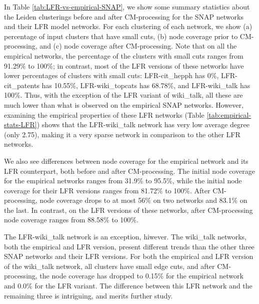 \documentclass[11pt]{article}   	%
\begin{document}
In Table \ref{tab:LFR-vs-empirical-SNAP}, we show some summary statistics about the  Leiden clusterings before and after CM-processing for the SNAP networks and their LFR model networks.  For each clustering of each network, we  show (a) percentage of input clusters that have small cuts, (b) node coverage prior to CM-processing, and (c) node coverage after CM-processing.
Note that on all the empirical networks, the percentage of the clusters with small cuts ranges from 91.29\% to 100\%; in contrast, most of the LFR versions of these
networks have lower percentages of clusters with small cuts:
LFR-cit\_hepph has 0\%,
LFR-cit\_patents has 10.55\%,
LFR-wiki\_topcats has 68.78\%, and
LFR-wiki\_talk has 100\%.
Thus, with the exception of the LFR variant of wiki\_talk, all these are much lower than what is observed on the empirical SNAP networks.
However, examining the empirical properties of these LFR networks (Table \ref{tab:empirical-stats-LFR}) shows that the LFR-wiki\_talk network has very
low average degree (only 2.75), making it a very sparse network in comparison to the other LFR networks.

We also see differences between node coverage for the empirical network and its  LFR counterpart, both before and after CM-processing.
The initial node coverage for the empirical networks ranges from 31.9\% to 95.5\%, while the initial node coverage for their LFR versions ranges from 81.72\% to 100\%.
After CM-processing,   node coverage drops to at most 56\% on two networks and 83.1\% on the last. In contrast, on the LFR versions of these networks, after CM-processing
node coverage  ranges from 88.58\% to 100\%.

The LFR-wiki\_talk network is an exception, hiwever. The wiki\_talk networks, both the empirical and LFR version, present different trends than the other three SNAP networks and their LFR versions.
For both the empirical and LFR version of the wiki\_talk network, all clusters have small edge cuts, and after CM-processing, the node coverage has dropped to 0.15\% for the
empirical network and 0.0\% for the LFR variant.
The difference between this LFR network and the remaining three is intriguing, and merits further study.
\end{document}
